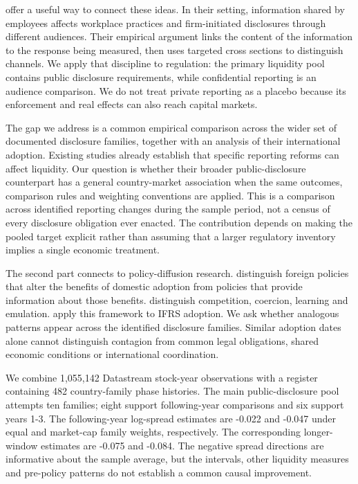 \documentclass[12pt,letterpaper]{article}
\begin{document}
\citet{dube2021} offer a useful way to connect these ideas. In their setting, information shared by employees affects workplace practices and firm-initiated disclosures through different audiences. Their empirical argument links the content of the information to the response being measured, then uses targeted cross sections to distinguish channels. We apply that discipline to regulation: the primary liquidity pool contains public disclosure requirements, while confidential reporting is an audience comparison. We do not treat private reporting as a placebo because its enforcement and real effects can also reach capital markets.


The gap we address is a common empirical comparison across the wider set of documented disclosure families, together with an analysis of their international adoption. Existing studies already establish that specific reporting reforms can affect liquidity. Our question is whether their broader public-disclosure counterpart has a general country-market association when the same outcomes, comparison rules and weighting conventions are applied. This is a comparison across identified reporting changes during the sample period, not a census of every disclosure obligation ever enacted. The contribution depends on making the pooled target explicit rather than assuming that a larger regulatory inventory implies a single economic treatment.


The second part connects to policy-diffusion research. \citet{simmons2004} distinguish foreign policies that alter the benefits of domestic adoption from policies that provide information about those benefits. \citet{simmons2006} distinguish competition, coercion, learning and emulation. \citet{koning2018} apply this framework to IFRS adoption. We ask whether analogous patterns appear across the identified disclosure families. Similar adoption dates alone cannot distinguish contagion from common legal obligations, shared economic conditions or international coordination.


We combine 1,055,142 Datastream stock-year observations with a register containing 482 country-family phase histories. The main public-disclosure pool attempts ten families; eight support following-year comparisons and six support years 1-3. The following-year log-spread estimates are -0.022 and -0.047 under equal and market-cap family weights, respectively. The corresponding longer-window estimates are -0.075 and -0.084. The negative spread directions are informative about the sample average, but the intervals, other liquidity measures and pre-policy patterns do not establish a common causal improvement.
\end{document}
